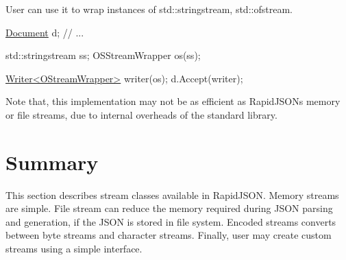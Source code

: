 User can use it to wrap instances of {\ttfamily std\+::stringstream}, {\ttfamily std\+::ofstream}.


\begin{DoxyCode}
\hyperlink{class_generic_document}{Document} d;
\textcolor{comment}{// ...}

std::stringstream ss;
OSStreamWrapper os(ss);

\hyperlink{class_writer}{Writer<OStreamWrapper>} writer(os);
d.Accept(writer);
\end{DoxyCode}


Note that, this implementation may not be as efficient as Rapid\+J\+S\+ON\textquotesingle{}s memory or file streams, due to internal overheads of the standard library.\hypertarget{md_Cadriciel_Commun_Externe_RapidJSON_doc_stream.zh-cn_Summary}{}\section{Summary}\label{md_Cadriciel_Commun_Externe_RapidJSON_doc_stream.zh-cn_Summary}
This section describes stream classes available in Rapid\+J\+S\+ON. Memory streams are simple. File stream can reduce the memory required during J\+S\+ON parsing and generation, if the J\+S\+ON is stored in file system. Encoded streams converts between byte streams and character streams. Finally, user may create custom streams using a simple interface. 
